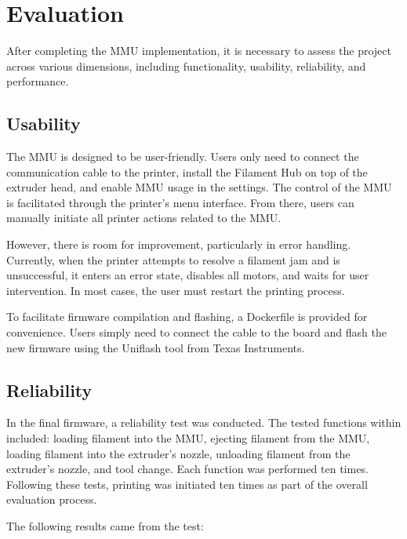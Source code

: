 \chapter{Evaluation}

After completing the MMU implementation, it is necessary to assess the project across various dimensions, including functionality, usability, reliability, and performance.

\section{Usability}

The MMU is designed to be user-friendly. Users only need to connect the communication cable to the printer, install the Filament Hub on top of the extruder head, and enable MMU usage in the settings. The control of the MMU is facilitated through the printer's menu interface. From there, users can manually initiate all printer actions related to the MMU.

However, there is room for improvement, particularly in error handling. Currently, when the printer attempts to resolve a filament jam and is unsuccessful, it enters an error state, disables all motors, and waits for user intervention. In most cases, the user must restart the printing process.

To facilitate firmware compilation and flashing, a Dockerfile is provided for convenience. Users simply need to connect the cable to the board and flash the new firmware using the Uniflash tool from Texas Instruments.

\section{Reliability}

In the final firmware, a reliability test was conducted. The tested functions within included: loading filament into the MMU, ejecting filament from the MMU, loading filament into the extruder's nozzle, unloading filament from the extruder's nozzle, and tool change. Each function was performed ten times. Following these tests, printing was initiated ten times as part of the overall evaluation process.

The following results came from the test:

